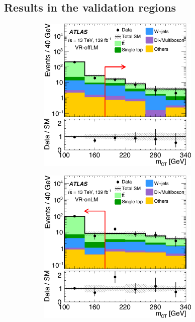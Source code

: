 \subsection{Results in the validation regions}
	
 \begin{figure}
	\centering
	\begin{subfigure}[b]{0.5\linewidth}
		\centering\includegraphics[width=0.85\textwidth]{fig_03b_yellow}
	\end{subfigure}\hfill
	\begin{subfigure}[b]{0.5\linewidth}
		\centering\includegraphics[width=0.85\textwidth]{fig_03a_yellow}

\end{subfigure}
\end{figure}
